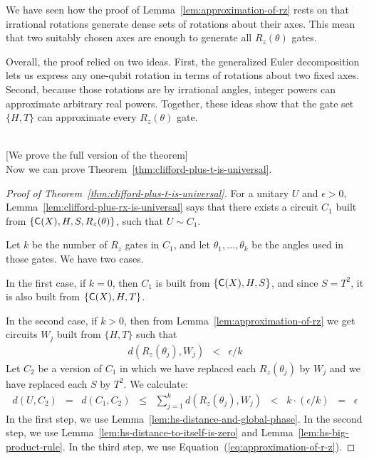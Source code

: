 \documentclass[11pt]{article}
\def\({\begin{eqnarray*}}
\def\){\end{eqnarray*}}
\def\C#1{\text{\sf C}{(#1)}}
\begin{document}
We have seen how the proof of Lemma~\ref{lem:approximation-of-rz}
rests on that irrational rotations generate dense sets of rotations about 
their axes. 
This mean that two suitably chosen axes are enough to generate 
all $R_z(\theta)$ gates.

Overall, the proof relied on two ideas. 
First, the generalized Euler decomposition lets us express 
any one-qubit rotation in terms of rotations about two fixed axes. 
Second, because those rotations are by irrational angles, 
integer powers can approximate arbitrary real powers. 
Together, these ideas show that 
the gate set $\{H,T\}$ can approximate every $R_z(\theta)$ gate.

\mbox{} \\ \hspace*{1cm}
   [We prove the full version of the theorem] \\
Now we can prove Theorem~\ref{thm:clifford-plus-t-is-universal}.

\begin{proof}[Proof of Theorem~\ref{thm:clifford-plus-t-is-universal}]
For a unitary $U$ and $\epsilon > 0$,
Lemma~\ref{lem:clifford-plus-rx-is-universal} says that
there exists a circuit $C_1$ built from $\{\C{X}, H, S, R_z(\theta)\}$,
such that $U \sim C_1$.

Let $k$ be the number of $R_z$ gates in $C_1$, and
let $\theta_1, \ldots, \theta_k$ be the angles used in those gates.
We have two cases.

In the first case,
if $k=0$, then $C_1$ is built from $\{\C{X},H,S\}$, and since
$S=T^2$, it is also built from $\{\C{X},H,T\}$.

In the second case, if $k>0$, then
from Lemma~\ref{lem:approximation-of-rz} we get circuits $W_j$ 
built from $\{H,T\}$ such that
\begin{eqnarray}
d(R_z(\theta_j),W_j) &<& \epsilon/k
\label{eq:approximation-of-r-z}
\end{eqnarray}
Let $C_2$ be a version of $C_1$ in which we have replaced
each $R_z(\theta_j)$ by $W_j$ and we have replaced each $S$ by $T^2$.
We calculate:
\(
d(U, C_2) &=& 
d(C_1, C_2) \;\;\leq\;\;
\sum_{j=1}^k d(R_z(\theta_j),W_j) \;\;<\;\;
k \cdot (\epsilon/k) \;\;=\;\; 
\epsilon
\)
In the first step, we use
Lemma~\ref{lem:hs-distance-and-global-phase}.
In the second step, we use 
Lemma~\ref{lem:hs-distance-to-itself-is-zero} and
Lemma~\ref{lem:hs-big-product-rule}.
In the third step, we use Equation~(\ref{eq:approximation-of-r-z}).
\end{proof}
\end{document}
